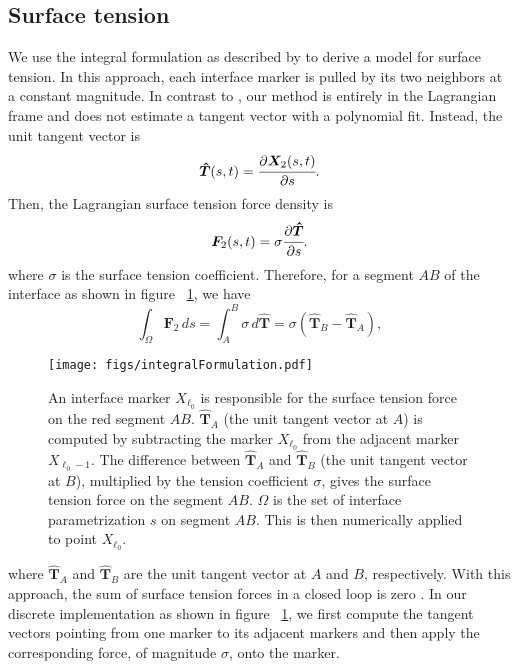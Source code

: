 \documentclass{jfm}
\begin{document}
\subsection{Surface tension}
We use the integral formulation as described by \citet{popinet2018numerical} to derive a model for surface tension. In this approach, each interface marker is pulled by its two neighbors at a constant magnitude. In contrast to \citep{tryggvason2001front}, our method is entirely in the Lagrangian frame and does not estimate a tangent vector with a polynomial fit. Instead, the unit tangent vector is 
\begin{equation}
\bm{\hat{T}}(s, t) = \cfrac{\partial \bm{X}_2(s, t)}{\partial s}. 
\end{equation}
Then, the Lagrangian surface tension force density is
\begin{equation}
\bm{F}_2(s,t) = \sigma \cfrac{\partial \bm{\hat{T}}}{\partial s}. 
\end{equation}
where $\sigma$ is the surface tension coefficient. 
Therefore, for a segment $AB$ of the interface as shown in figure ~\ref{fig:integralFormulation}, we have
\begin{equation}
\int_{\Omega} \bm{F}_2 \, ds = \int_{A}^{B} \sigma \, d \bm{\hat{T}} = \sigma (\bm{\hat{T}}_B - \bm{\hat{T}}_A),
\end{equation}
 \label{eq:tension}
\begin{figure}
    \centering
    \texttt{[image: figs/integralFormulation.pdf]}
    \caption{\label{fig:integralFormulation}
        An interface marker $X_{\ell_0}$ is responsible for the surface tension force on the red segment $AB$. $\bm{\hat{T}}_A$ (the unit tangent vector at $A$) is computed by subtracting the marker $X_{\ell_0}$ from the adjacent marker $X_{\ell_0-1}$. The difference between $\bm{\hat{T}}_A$ and $\bm{\hat{T}}_B$ (the unit tangent vector at $B$), multiplied by the tension coefficient $\sigma$, gives the surface tension force on the segment $AB$. $\Omega$ is the set of interface parametrization $s$ on segment $AB$. This is then numerically applied to point $X_{\ell_0}$. 
    }
\end{figure}
where $\bm{\hat{T}}_A$ and $\bm{\hat{T}}_B$ are the unit tangent vector at $A$ and $B$, respectively. With this approach, the sum of surface tension forces in a closed loop is zero \citep{popinet2018numerical}. In our discrete implementation as shown in figure ~\ref{fig:integralFormulation}, we first compute the tangent vectors pointing from one marker to its adjacent markers and then apply the corresponding force, of magnitude $\sigma$, onto the marker. 
\end{document}
